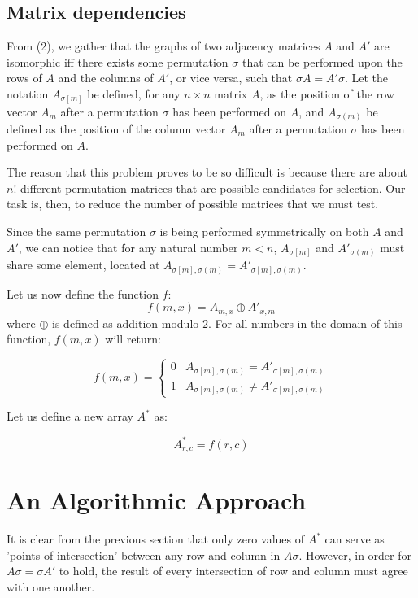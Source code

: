 \documentclass[12pt]{article}
\begin{document}
\subsection{Matrix dependencies}

From (2), we gather that the graphs of two adjacency matrices $A$ and $A'$ are isomorphic iff there exists some permutation $\sigma$ that can be performed upon the rows of $A$ and the columns of $A'$, or vice versa, such that $\sigma A = A' \sigma$. Let the notation $A_{\sigma[m]}$ be defined, for any $n \times n$ matrix $A$, as the position of the row vector $A_m$ after a permutation $\sigma$ has been performed on $A$, and $A_{\sigma(m)}$ be defined as the position of the column vector $A_m$ after a permutation $\sigma$ has been performed on $A$.

The reason that this problem proves to be so difficult is because there are about $n!$ different permutation matrices that are possible candidates for selection. Our task is, then, to reduce the number of possible matrices that we must test.

Since the same permutation $\sigma$ is being performed symmetrically on both $A$ and $A'$, we can notice that for any natural number $m<n$, $A_{\sigma[m]}$ and $A'_{\sigma(m)}$ must share some element, located at $A_{\sigma[m], \sigma(m)} = A'_{\sigma[m], \sigma(m)}$.


Let us now define the function $f$:
\begin{equation}
f(m,x) = A_{m,x} \oplus A'_{x,m}
\end{equation}
where $\oplus$ is defined as addition modulo $2$. For all numbers in the domain of this function, $f(m,x)$ will return:

 \begin{displaymath}
   f(m,x) = \left\{
     \begin{array}{lr}
       0 & A_{\sigma[m], \sigma(m)} = A'_{\sigma[m], \sigma(m)}\\
       1 & A_{\sigma[m], \sigma(m)} \neq A'_{\sigma[m], \sigma(m)}
     \end{array}
   \right.
\end{displaymath} 

Let us define a new array $A^*$ as:

\begin{equation}
A^*_{r,c} = f(r,c)
\end{equation}


\section{An Algorithmic Approach}
It is clear from the previous section that only zero values of $A^*$ can serve as 'points of intersection' between any row and column in $A \sigma$. However, in order for $A \sigma = \sigma A'$ to hold, the result of every intersection of row and column must agree with one another.
\end{document}
